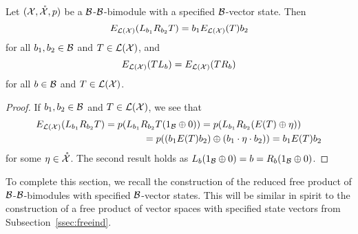 \begin{proposition}
	\label{prop:propertiesofEforLX}
	Let $(\mathcal{X}, \mathring{\mathcal{X}}, p)$ be a $\mathcal{B}$-$\mathcal{B}$-bimodule with a specified $\mathcal{B}$-vector state.
	Then
	\[
		E_{\mathcal{L}(\mathcal{X})}(L_{b_1} R_{b_2} T) = b_1 E_{\mathcal{L}(\mathcal{X})}(T) b_2
	\]
	for all $b_1, b_2 \in \mathcal{B}$ and $T \in \mathcal{L}(\mathcal{X})$, and
	\[
		E_{\mathcal{L}(\mathcal{X})}(TL_b) = E_{\mathcal{L}(\mathcal{X})}(TR_b)
	\]
	for all $b \in \mathcal{B}$ and $T \in \mathcal{L}(\mathcal{X})$.
\end{proposition}

\begin{proof}
	If $b_1, b_2 \in \mathcal{B}$ and $T \in \mathcal{L}(\mathcal{X})$, we see that
	\begin{align*}
		E_{\mathcal{L}(\mathcal{X})}(L_{b_1} R_{b_2} T)
		&= p(L_{b_1} R_{b_2} T(1_{\mathcal{B}} \oplus 0))
		= p(L_{b_1} R_{b_2} (E(T) \oplus \eta)) \\
		&\qquad\qquad = p( (b_1 E(T) b_2) \oplus (b_1 \cdot \eta \cdot b_2))
		= b_1 E(T) b_2
	\end{align*}
	for some $\eta \in \mathring{\mathcal{X}}$. The second result holds as $L_b(1_{\mathcal{B}}\oplus 0) = b = R_b(1_{\mathcal{B}}\oplus0)$.
\end{proof}

To complete this section, we recall the construction of the reduced free product of $\mathcal{B}$-$\mathcal{B}$-bimodules with specified $\mathcal{B}$-vector states.
This will be similar in spirit to the construction of a free product of vector spaces with specified state vectors from Subsection~\ref{ssec:freeind}.

